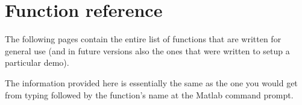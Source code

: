 
\hypertarget{Chapter:FuncRef}{
\chapter{Function reference}}

The following pages contain the entire list of functions that are
written for general use (and in future versions also the ones that
were written to setup a particular demo).

The information provided here is essentially the same as the one
you would get from typing
 followed by the
function's name at the Matlab command prompt.\\



